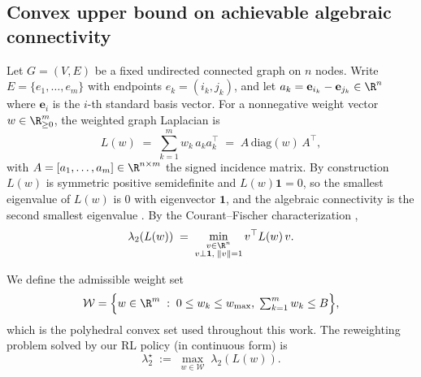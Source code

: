%
%

\subsection{Convex upper bound on achievable algebraic connectivity}

Let $G = (V, E)$ be a fixed undirected connected graph on $n$ nodes. Write
$E = \{e_1, \ldots, e_m\}$ with endpoints $e_k = (i_k, j_k)$, and let
$a_k = \mathbf{e}_{i_k} - \mathbf{e}_{j_k} \in \R^n$ where
$\mathbf{e}_i$ is the $i$-th standard basis vector. For a nonnegative
weight vector $w \in \R^m_{\ge 0}$, the weighted graph Laplacian is
\begin{equation}
L(w) \;=\; \sum_{k=1}^{m} w_k\, a_k a_k^\top
\;=\; A\,\mathrm{diag}(w)\,A^\top,
\label{eq:Lw}
\end{equation}
with $A = [a_1, \ldots, a_m] \in \R^{n \times m}$ the signed
incidence matrix. By construction $L(w)$ is symmetric positive
semidefinite and $L(w)\mathbf{1} = 0$, so the smallest eigenvalue of
$L(w)$ is $0$ with eigenvector $\mathbf{1}$, and the algebraic
connectivity is the second smallest eigenvalue
\cite{Fiedler1973,OlfatiSaber2007}. By the Courant--Fischer
characterization \cite{HornJohnson2013},
\begin{equation}
\lambda_2(L(w)) \;=\; \min_{\substack{v \in \R^n \\ v \perp \mathbf{1},\; \|v\|=1}} v^\top L(w)\, v.
\label{eq:rayleigh}
\end{equation}

We define the admissible weight set
\begin{equation}
\mathcal{W} = \Big\{ w \in \R^m \;:\; 0 \le w_k \le w_{\max},\;
\textstyle\sum_{k=1}^m w_k \le B \Big\},
\label{eq:Wset}
\end{equation}
which is the polyhedral convex set used throughout this work. The
reweighting problem solved by our RL policy (in continuous form) is
\begin{equation}
\lambda_2^\star \;:=\; \max_{w \in \mathcal{W}} \; \lambda_2(L(w)).
\label{eq:primal}
\end{equation}

